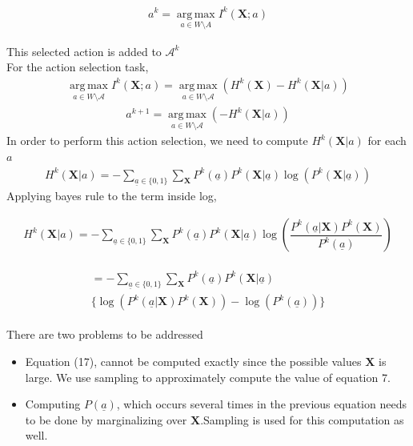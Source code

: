 \documentclass[10pt,twocolumn,letterpaper]{article}
\begin{document}
\begin{align}
a^{k} = \operatorname*{arg\,max}_{a\in W \setminus A} I^{k}(\textbf{X};a)
\end{align}

This selected action is added to $\mathcal{A}^{k}$\\
For the action selection task,
\begin{align}
\operatorname*{arg\,max}_{a\in W \setminus{\mathcal{A}}}I^{k}(\textbf{X}; a) =\operatorname*{arg\,max}_{a\in W \setminus{\mathcal{A}}} (H^{k}(\textbf{X}) - H^{k}(\textbf{X}|a))
\end{align}
\begin{align}
a^{k+1} =\operatorname*{arg\,max}_{a\in W \setminus{\mathcal{A}}} (- H^{k}(\textbf{X}|a))
\end{align}
In order to perform this action selection, we need to compute $H^{k}(\textbf{X}|a)$ for each $a$
\begin{align}
H^{k}(\textbf{X}| a) = -\sum_{\underline{a}\in\lbrace 0 ,1 \rbrace} \sum_{\textbf{X}} P^{k}(\underline{a})P^{k}(\textbf{X}| \underline{a}) \log(P^{k}(\textbf{X}| \underline{a}))
\end{align}
Applying bayes rule to the term inside log,

\begin{align}
H^{k}(\textbf{X}| a)= -\sum_{\underline{a}\in\lbrace 0 ,1 \rbrace} \sum_{\textbf{X}} P^{k}( \underline{a})P^{k}(\textbf{X}| \underline{a}) \log(\dfrac{P^{k}( \underline{a}|\textbf{X})P^{k}(\textbf{X})}{P^{k}( \underline{a})})
\end{align}

\begin{align}
\begin{split}
 = -\sum_{\underline{a}\in\lbrace 0 ,1 \rbrace} \sum_{\textbf{X}} P^{k}( \underline{a})  P^{k}(\textbf{X}| \underline{a}) \\ \Big\lbrace\log(P^{k}( \underline{a}|\textbf{X})P^{k}(\textbf{X})) - \log(P^{k}( \underline{a}))\Big\rbrace
\end{split}
\end{align}

There are two problems to be addressed
\begin{itemize}

\item{Equation (17), cannot be computed exactly since the possible values $\textbf{X}$ is large. We use sampling to approximately compute the value of equation 7.}

\item{Computing $P( \underline{a})$, which occurs several times in the previous equation needs to be done by marginalizing over $\textbf{X}$.Sampling is used for this computation as well.} 
\end{itemize}
\end{document}
